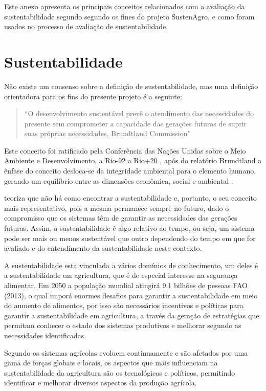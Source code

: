 Este anexo apresenta os principais conceitos relacionados com a avaliação
da sustentabilidade segundo segundo os fines do projeto SustenAgro,
e como foram usados no processo de avaliação de sustentabilidade.

\section{Sustentabilidade}

Não existe um consenso sobre a definição de sustentabilidade, mas
uma definição orientadora para os fins do presente projeto é a seguinte:
\begin{quotation}
``O desenvolvimento sustentável prevê o atendimento das necessidades
do presente sem comprometer a capacidade das gerações futuras de suprir
suas próprias necessidades, \foreignlanguage{english}{Brundtland Commission}''
\citet{Burton:1987,brundtland1987our}
\end{quotation}
Este conceito foi ratificado pela Conferência das Nações Unidas sobre
o Meio Ambiente e Desenvolvimento, a Rio-92 \citet{ehlers1996agricultura}
a Rio+20 \citet{ONU2012}, após do relatório \foreignlanguage{english}{Brundtland}
a ênfase do conceito desloca-se da integridade ambiental para o elemento
humano, gerando um equilíbrio entre as dimensões econômica, social
e ambiental \citet{van2005indicadores}.

\citet{gliessman2001agroecologia} teoriza que não há como encontrar
a sustentabilidade e, portanto, o seu conceito mais representativo,
pois a mesma permanece sempre no futuro, dado o compromisso que os
sistemas têm de garantir as necessidades das gerações futuras. Assim,
a sustentabilidade é algo relativo ao tempo, ou seja, um sistema pode
ser mais ou menos sustentável que outro dependendo do tempo em que
for avaliado e do entendimento da sustentabilidade neste contexto.

A sustentabilidade esta vinculada a vários domínios de conhecimento,
um deles é a sustentabilidade em agricultura, que é de especial interesse
na segurança alimentar. Em 2050 a população mundial atingirá 9.1 bilhões
de pessoas FAO (2013), o qual imporá enormes desafios para garantir
a sustentabilidade em meio do aumento de alimentos, por isso são necessários
incentivos e políticas para garantir a sustentabilidade em agricultura,
a través da geração de estratégias que permitam conhecer o estado
dos sistemas produtivos e melhorar segundo as necessidades identificadas.

Segundo \citet{van2008integrated} os sistemas agrícolas evoluem continuamente
e são afetados por uma gama de forças globais e locais, os aspectos
que mais influenciam na sustentabilidade da agricultura são os tecnológicos
e políticos, permitindo identificar e melhorar diversos aspectos da
produção agrícola. 

